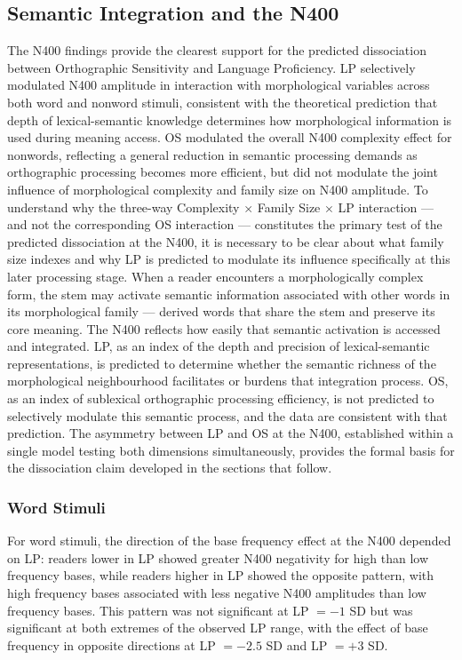 \documentclass[utf8]{FrontiersinHarvard} %
\begin{document}
	\subsection{Semantic Integration and the N400}
	
	The N400 findings provide the clearest support for the predicted dissociation between Orthographic Sensitivity and Language Proficiency. LP selectively modulated N400 amplitude in interaction with morphological variables across both word and nonword stimuli, consistent with the theoretical prediction that depth of lexical-semantic knowledge determines how morphological information is used during meaning access. OS modulated the overall N400 complexity effect for nonwords, reflecting a general reduction in semantic processing demands as orthographic processing becomes more efficient, but did not modulate the joint influence of morphological complexity and family size on N400 amplitude. To understand why the three-way Complexity $\times$ Family Size $\times$ LP interaction --- and not the corresponding OS interaction --- constitutes the primary test of the predicted dissociation at the N400, it is necessary to be clear about what family size indexes and why LP is predicted to modulate its influence specifically at this later processing stage. When a reader encounters a morphologically complex form, the stem may activate semantic information associated with other words in its morphological family --- derived words that share the stem and preserve its core meaning. The N400 reflects how easily that semantic activation is accessed and integrated. LP, as an index of the depth and precision of lexical-semantic representations, is predicted to determine whether the semantic richness of the morphological neighbourhood facilitates or burdens that integration process. OS, as an index of sublexical orthographic processing efficiency, is not predicted to selectively modulate this semantic process, and the data are consistent with that prediction. The asymmetry between LP and OS at the N400, established within a single model testing both dimensions simultaneously, provides the formal basis for the dissociation claim developed in the sections that follow.
	
	\subsubsection{Word Stimuli}
	
	For word stimuli, the direction of the base frequency effect at the N400 depended on LP: readers lower in LP showed greater N400 negativity for high than low frequency bases, while readers higher in LP showed the opposite pattern, with high frequency bases associated with less negative N400 amplitudes than low frequency bases. This pattern was not significant at LP $= -1$ SD but was significant at both extremes of the observed LP range, with the effect of base frequency in opposite directions at LP $= -2.5$ SD and LP $= +3$ SD.
	
\end{document}
